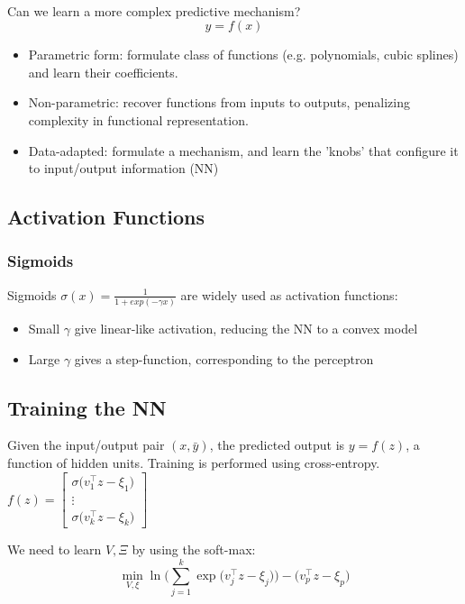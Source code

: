 \documentclass[a4, 10pt]{article}
\begin{document}
\noindent \\
\noindent
Can we learn a more complex predictive mechanism?
$$ y= f(x)$$

\begin{itemize}
	\item Parametric form:  formulate class of functions (e.g. polynomials, cubic splines) and learn their coefficients.
	\item Non-parametric:  recover functions from inputs to outputs, penalizing complexity in functional representation.
	\item Data-adapted:  formulate a mechanism, and learn the 'knobs' that configure it to input/output information (NN)
\end{itemize}

\subsection{Activation Functions}

\subsubsection{Sigmoids}

Sigmoids $\sigma(x) = \frac{1}{1 + exp(-\gamma x)}$ are widely used as activation functions:
\begin{itemize}
	\item Small $\gamma$ give linear-like activation, reducing the NN to a convex model
	\item Large $\gamma$ gives a step-function, corresponding to the perceptron
\end{itemize}

\subsection{Training the NN}
Given the input/output pair $(x, \bar y)$, the predicted output is $y = f(z)$, a  function of hidden units.  Training is performed using cross-entropy.\\

$f(z) = 	\begin{bmatrix}
		\sigma\Big( v_1^\top z - \xi_1 \Big) \\
		\vdots \\
		\sigma\Big( v_k^\top z - \xi_k \Big)
		\end{bmatrix}$
	
We need to learn $V, \Xi$ by using the soft-max:
$$ \displaystyle \min_{V, \xi} \ln \Bigg( \sum_{j=1}^k \exp \Big(v_j^\top z - \xi_j \Big) \Bigg) - \Big( v_p^\top z - \xi_p \Big) $$
\end{document}
